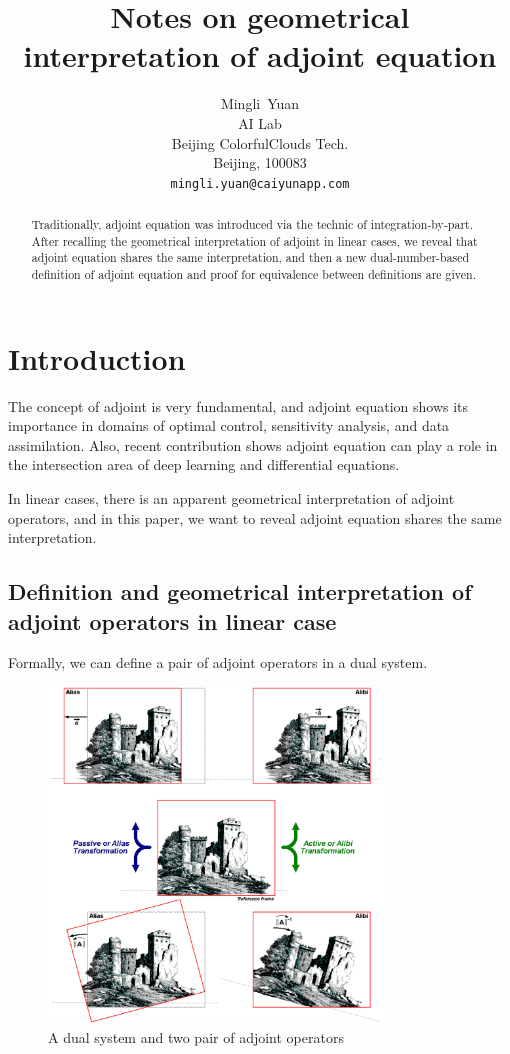 \documentclass{article}
\title{Notes on geometrical interpretation of adjoint equation}
\author{
  Mingli~Yuan \\
  AI Lab \\
  Beijing ColorfulClouds Tech.\\
  Beijing, 100083 \\
  \texttt{mingli.yuan@caiyunapp.com} \\
}
\begin{document}
\maketitle

\begin{abstract}
Traditionally, adjoint equation was introduced via the technic of integration-by-part.
After recalling the geometrical interpretation of adjoint in linear cases,
we reveal that adjoint equation shares the same interpretation,
and then a new dual-number-based definition of adjoint equation and proof for equivalence between definitions are given.
\end{abstract}


\section{Introduction}

The concept of adjoint is very fundamental\cite{Daz1953MethodsOM}\cite{Marchuk1995}, and adjoint equation shows its importance in domains of optimal control\cite{Liberzon2012CalculusOV}, sensitivity analysis\cite{hall1983physical}, and data assimilation\cite{Errico1997WhatIA}. Also, recent contribution\cite{Chen2018NeuralOD} shows adjoint equation can play a role in the intersection area of deep learning and differential equations.

In linear cases, there is an apparent geometrical interpretation of adjoint operators, and in this paper, we want to reveal adjoint equation shares the same interpretation.

\subsection{Definition and geometrical interpretation of adjoint operators in linear case}

Formally, we can define a pair of adjoint operators in a dual system.

\begin{figure}[ht]
\centering
\includegraphics[width=3.5in]{../images/adjoint/alias_and_alibi.png}
\caption{A dual system and two pair of adjoint operators\cite{wiki:aatrans}}
\end{figure}
\end{document}
